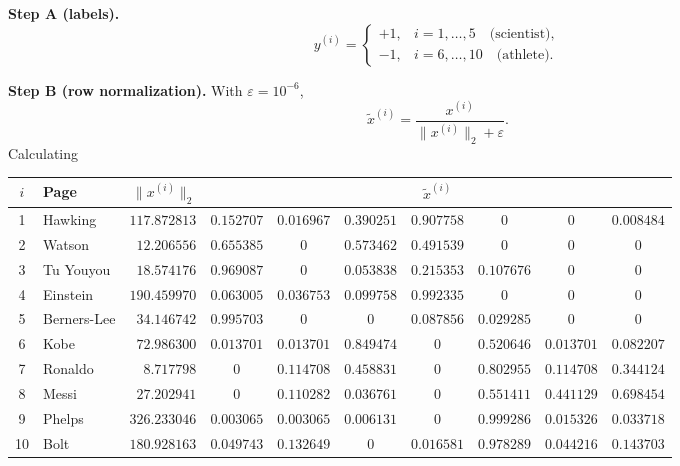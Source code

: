 \documentclass[fleqn]{article}
\begin{document}
    \medskip
    \noindent\textbf{Step A (labels).}
    \[
        y^{(i)}=
        \begin{cases}
            +1, & i=1,\ldots,5 \quad\text{(scientist)},\\
            -1, & i=6,\ldots,10 \quad\text{(athlete)}.
        \end{cases}
    \]

    \medskip
    \noindent\textbf{Step B (row normalization).}
    With $\varepsilon=10^{-6}$,
    \[
        \tilde{x}^{(i)}=\frac{x^{(i)}}{\|x^{(i)}\|_2+\varepsilon}.
    \]
    Calculating
    \begin{center}
    {\footnotesize
    \begin{tabular}{c|l|r|ccccccc}
        $i$ & Page & $\|x^{(i)}\|_2$ & \multicolumn{7}{c}{$\tilde{x}^{(i)}$} \\
        \hline
        1 & Hawking & $117.872813$ &
        $0.152707$ & $0.016967$ & $0.390251$ & $0.907758$ & $0$ & $0$ & $0.008484$ \\
        2 & Watson & $12.206556$ &
        $0.655385$ & $0$ & $0.573462$ & $0.491539$ & $0$ & $0$ & $0$ \\
        3 & Tu Youyou & $18.574176$ &
        $0.969087$ & $0$ & $0.053838$ & $0.215353$ & $0.107676$ & $0$ & $0$ \\
        4 & Einstein & $190.459970$ &
        $0.063005$ & $0.036753$ & $0.099758$ & $0.992335$ & $0$ & $0$ & $0$ \\
        5 & Berners-Lee & $34.146742$ &
        $0.995703$ & $0$ & $0$ & $0.087856$ & $0.029285$ & $0$ & $0$ \\
        6 & Kobe & $72.986300$ &
        $0.013701$ & $0.013701$ & $0.849474$ & $0$ & $0.520646$ & $0.013701$ & $0.082207$ \\
        7 & Ronaldo & $8.717798$ &
        $0$ & $0.114708$ & $0.458831$ & $0$ & $0.802955$ & $0.114708$ & $0.344124$ \\
        8 & Messi & $27.202941$ &
        $0$ & $0.110282$ & $0.036761$ & $0$ & $0.551411$ & $0.441129$ & $0.698454$ \\
        9 & Phelps & $326.233046$ &
        $0.003065$ & $0.003065$ & $0.006131$ & $0$ & $0.999286$ & $0.015326$ & $0.033718$ \\
        10 & Bolt & $180.928163$ &
        $0.049743$ & $0.132649$ & $0$ & $0.016581$ & $0.978289$ & $0.044216$ & $0.143703$ \\
        \hline
    \end{tabular}
    }
    \end{center}
\end{document}
